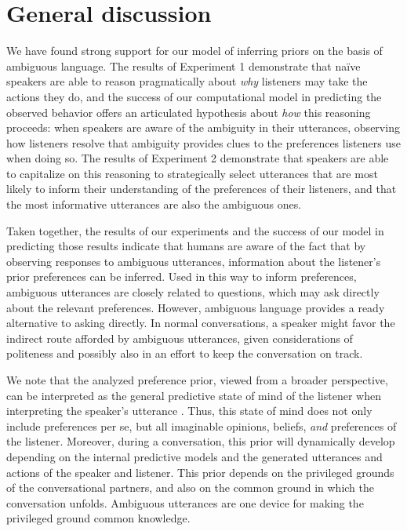 \documentclass[10pt,a4paper]{article}
\begin{document}
\section{General discussion}

We have found strong support for our model of inferring priors on the basis of ambiguous language.
The results of Experiment 1 demonstrate that na\"ive speakers are able to reason pragmatically about \emph{why} listeners may take the actions they do, and the success of our computational model in predicting the observed behavior offers an articulated hypothesis about \emph{how} this reasoning proceeds: when speakers are aware of the ambiguity in their utterances, observing how listeners resolve that ambiguity provides clues to the preferences listeners use when doing so.
The results of Experiment 2 demonstrate that speakers are able to capitalize on this reasoning to strategically select utterances that are most likely to inform their understanding of the preferences of their listeners, and that the most informative utterances are also the ambiguous ones.

Taken together, the results of our experiments and the success of our model in predicting those results indicate that humans are aware of the fact that by observing responses to ambiguous utterances, information about the listener's prior preferences can be inferred. 
Used in this way to inform preferences, ambiguous utterances are closely related to questions, which may ask directly about the  relevant preferences. 
However, ambiguous language provides a ready alternative to asking directly. In normal conversations, a speaker might favor the indirect route afforded by ambiguous utterances, given considerations of politeness and possibly also in an effort to keep the conversation on track.  

We note that the analyzed preference prior, viewed from a broader perspective, can be interpreted as the general predictive state of mind of the listener when interpreting the speaker's utterance \cite{Butz:2017}. 
Thus, this state of mind does not only include preferences per se, but all imaginable opinions, beliefs, \emph{and} preferences of the listener. 
Moreover, during a conversation, this prior will dynamically develop depending on the internal predictive models and the generated utterances and actions of the speaker and listener. This prior depends on the privileged grounds of the conversational partners, and also on the common ground in which the conversation unfolds. Ambiguous utterances are one device for making the privileged ground common knowledge. 




\setlength{\bibleftmargin}{.125in}
\setlength{\bibindent}{-\bibleftmargin}


\end{document}
